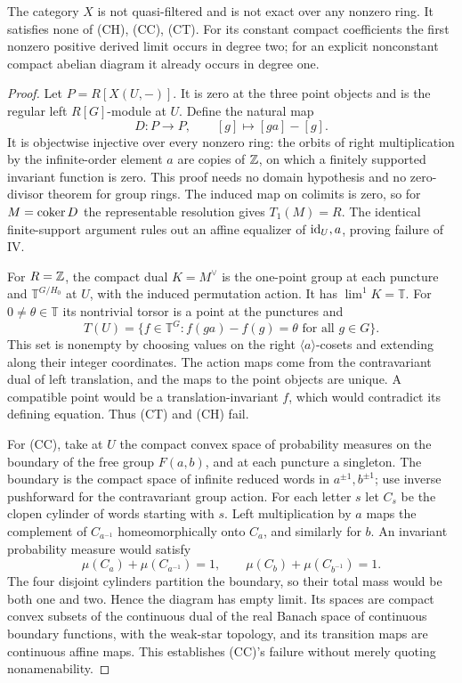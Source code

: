 \begin{proposition}\label{C:exit-nonconstant}
The category $X$ is not quasi-filtered and is not exact over any nonzero ring. It satisfies none of (CH), (CC), (CT). For its constant compact coefficients the first nonzero positive derived limit occurs in degree two; for an explicit nonconstant compact abelian diagram it already occurs in degree one.
\end{proposition}
\begin{proof}
Let $P=R[X(U,-)]$. It is zero at the three point objects and is the regular left $R[G]$-module at $U$. Define the natural map
\[
 D:P\to P,\qquad [g]\mapsto[ga]-[g].
\]
It is objectwise injective over every nonzero ring: the orbits of right multiplication by the infinite-order element $a$ are copies of $\mathbb Z$, on which a finitely supported invariant function is zero. This proof needs no domain hypothesis and no zero-divisor theorem for group rings. The induced map on colimits is zero, so for $M=\operatorname{coker} D$ the representable resolution gives $T_1(M)=R$. The identical finite-support argument rules out an affine equalizer of $\mathrm{id}_U,a$, proving failure of IV.

For $R=\mathbb Z$, the compact dual $K=M^\vee$ is the one-point group at each puncture and $\mathbb T^{G/H_0}$ at $U$, with the induced permutation action. It has $\lim^1K=\mathbb T$. For $0\ne\theta\in\mathbb T$ its nontrivial torsor is a point at the punctures and
\[
 T(U)=\{f\in\mathbb T^G:f(ga)-f(g)=\theta\text{ for all }g\in G\}.
\]
This set is nonempty by choosing values on the right $\langle a\rangle$-cosets and extending along their integer coordinates. The action maps come from the contravariant dual of left translation, and the maps to the point objects are unique. A compatible point would be a translation-invariant $f$, which would contradict its defining equation. Thus (CT) and (CH) fail.

For (CC), take at $U$ the compact convex space of probability measures on the boundary of the free group $F(a,b)$, and at each puncture a singleton. The boundary is the compact space of infinite reduced words in $a^{\pm1},b^{\pm1}$; use inverse pushforward for the contravariant group action. For each letter $s$ let $C_s$ be the clopen cylinder of words starting with $s$. Left multiplication by $a$ maps the complement of $C_{a^{-1}}$ homeomorphically onto $C_a$, and similarly for $b$. An invariant probability measure would satisfy
\[
 \mu(C_a)+\mu(C_{a^{-1}})=1,
 \qquad \mu(C_b)+\mu(C_{b^{-1}})=1.
\]
The four disjoint cylinders partition the boundary, so their total mass would be both one and two. Hence the diagram has empty limit. Its spaces are compact convex subsets of the continuous dual of the real Banach space of continuous boundary functions, with the weak-star topology, and its transition maps are continuous affine maps. This establishes (CC)'s failure without merely quoting nonamenability.
\end{proof}

